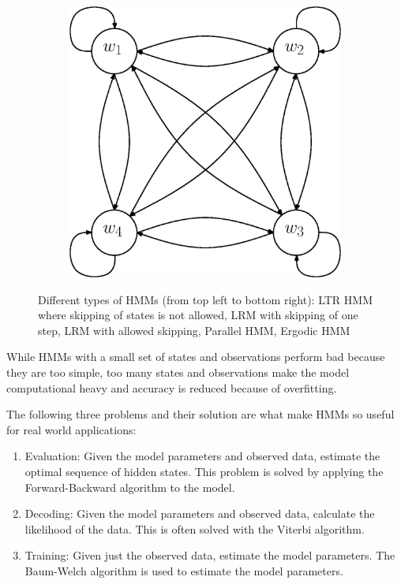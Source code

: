 \documentclass[a4paper, oneside]{csthesis}
\begin{document}
\begin{figure}
        \begin{subfigure}[b]{0.25\textwidth}
                \centering
                \includegraphics[width=\textwidth]{figures/hmm-ltr4.eps}
                \label{fig:hmm1}
        \end{subfigure}%



        \caption{Different types of HMMs (from top left to bottom right): LTR HMM where skipping of states is not allowed, LRM with skipping of one step, LRM with allowed skipping, Parallel HMM, Ergodic HMM}\label{fig:markov-models}
\end{figure}



While HMMs with a small set of states and observations perform bad because they are too simple, too many states and observations make the model computational heavy and accuracy is reduced because of overfitting.

The following three problems and their solution are what make HMMs so useful for real world applications:
\begin{enumerate}
\item Evaluation: Given the model parameters and observed data, estimate the optimal sequence of hidden states. This problem is solved by applying the Forward-Backward algorithm to the model.
\item Decoding: Given the model parameters and observed data, calculate the likelihood of the data. This is often solved with the Viterbi algorithm.
\item Training: Given just the observed data, estimate the model parameters. The Baum-Welch algorithm is used to estimate the model parameters.
\end{enumerate}
\end{document}
